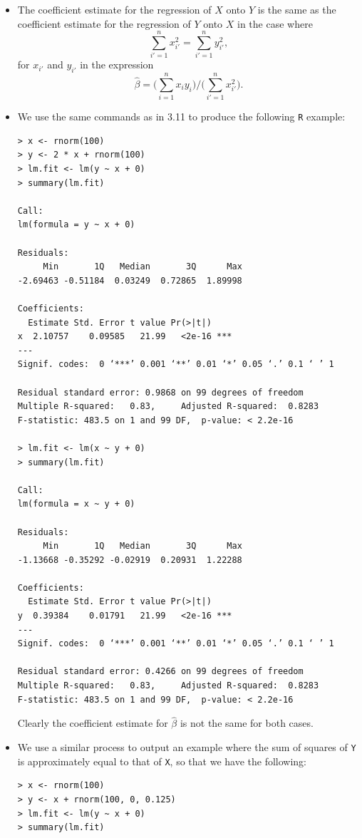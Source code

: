 \begin{itemize}
    \item[(a)] The coefficient estimate for the regression of $X$ onto
        $Y$ is the same
        as the coefficient estimate for the regression of $Y$ onto $X$ in
        the case where
        \[
            \sum_{i' = 1}^n x_{i'}^2 = \sum_{i' = 1}^n y_{i'}^2,
        \]
        for $x_{i'}$ and $y_{i'}$ in the expression
        \[
            \hat{\beta} = \Biggl(\sum_{i = 1}^n x_i y_i \Biggr) /
            \Biggl(\sum_{i' = 1}^n x_{i'}^2 \Biggr).
        \]
    \item[(b)] We use the same commands as in 3.11 to produce the
        following \verb|R|
        example:
        \begin{lstlisting}
> x <- rnorm(100)
> y <- 2 * x + rnorm(100)
> lm.fit <- lm(y ~ x + 0)
> summary(lm.fit)

Call:
lm(formula = y ~ x + 0)

Residuals:
     Min       1Q   Median       3Q      Max
-2.69463 -0.51184  0.03249  0.72865  1.89998

Coefficients:
  Estimate Std. Error t value Pr(>|t|)
x  2.10757    0.09585   21.99   <2e-16 ***
---
Signif. codes:  0 ‘***’ 0.001 ‘**’ 0.01 ‘*’ 0.05 ‘.’ 0.1 ‘ ’ 1

Residual standard error: 0.9868 on 99 degrees of freedom
Multiple R-squared:   0.83,     Adjusted R-squared:  0.8283
F-statistic: 483.5 on 1 and 99 DF,  p-value: < 2.2e-16

> lm.fit <- lm(x ~ y + 0)
> summary(lm.fit)

Call:
lm(formula = x ~ y + 0)

Residuals:
     Min       1Q   Median       3Q      Max
-1.13668 -0.35292 -0.02919  0.20931  1.22288

Coefficients:
  Estimate Std. Error t value Pr(>|t|)
y  0.39384    0.01791   21.99   <2e-16 ***
---
Signif. codes:  0 ‘***’ 0.001 ‘**’ 0.01 ‘*’ 0.05 ‘.’ 0.1 ‘ ’ 1

Residual standard error: 0.4266 on 99 degrees of freedom
Multiple R-squared:   0.83,     Adjusted R-squared:  0.8283
F-statistic: 483.5 on 1 and 99 DF,  p-value: < 2.2e-16
        \end{lstlisting}
        Clearly the coefficient estimate for $\hat{\beta}$ is not the
        same for both cases.
    \item[(c)] We use a similar process to output an example where the
        sum of squares
        of \verb|Y| is approximately equal to that of \verb|X|, so that we have the
        following:
        \begin{lstlisting}
> x <- rnorm(100)
> y <- x + rnorm(100, 0, 0.125)
> lm.fit <- lm(y ~ x + 0)
> summary(lm.fit)


\end{lstlisting}
\end{itemize}
